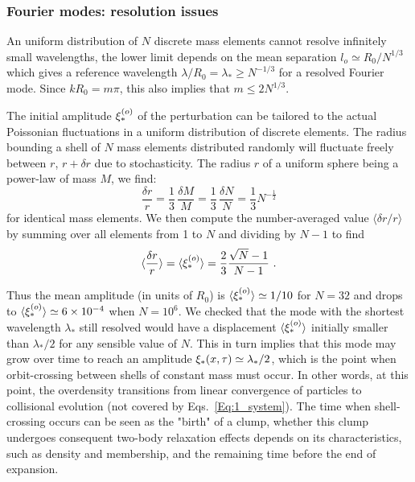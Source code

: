 \subsubsection{Fourier modes: resolution issues} 
\label{Ssub:1_FourierModes}
An uniform distribution of $N$ discrete mass elements cannot resolve infinitely small wavelengths, the lower limit depends on the mean separation $l_o\simeq R_0 / N^{1/3}$ which gives a reference wavelength $\lambda / R_0 = \lambda_\ast \ge N^{-1/3}$ for a resolved  Fourier mode. 
Since $kR_0 = m\pi$, this also implies that $ m \le 2 N^{1/3}$.  

The initial amplitude $\xi_\ast^{(o)}$  of the perturbation can be tailored to the actual Poissonian fluctuations in a uniform distribution of discrete elements. The radius bounding a shell of $N$ mass elements distributed randomly will fluctuate freely between $r$, $r + \delta r$ due to stochasticity. The radius $r$ of a uniform sphere being a power-law of mass $M$, we 
find:
\begin{equation}
\frac{\delta r}{r} = \frac{1}{3}\,\frac{\delta M}{M} =  \frac{1}{3}\,\frac{\delta N}{N} = \frac{1}{3} N^{-\frac{1}{2}}
\end{equation}
 for identical mass elements. We then compute the number-averaged value $\langle \delta r/r\rangle$ by summing over  all elements from 1 to $N$ and dividing by $N-1$ to find 
\begin{equation}
\langle \frac{\delta r}{r} \rangle = \langle \xistaro\rangle = \frac{2}{3} \frac{\sqrt{N} - 1 }{N - 1} \ .
\end{equation}  

Thus the mean amplitude (in units of $R_0$) is $\langle\xi_\ast^{(o)}\rangle\simeq 1/10$ for $N=32$ and drops to $\langle\xi_\ast^{(o)}\rangle\simeq 6\times 10^{-4}$ when $N = 10^6$. We checked that the mode with the shortest wavelength $\lambda_\ast$ still resolved would have a displacement $\langle\xi_\ast^{(o)}\rangle$ initially 
smaller than $\lambda_\ast/2$ for any sensible value of $N$. This in turn implies that this mode may grow over time to reach an amplitude $\xi_\ast(x,\tau) \simeq \lambda_\ast/2$, which is the point when orbit-crossing between shells of constant mass must occur. In other words, at this point, the overdensity transitions from linear convergence of particles to  collisional evolution (not covered by Eqs.~\ref{Eq:1_system}). The time when shell-crossing occurs can be seen as the "birth" of a clump, whether this clump undergoes consequent two-body relaxation effects depends on its characteristics, such as density and membership, and the remaining time before the end of expansion. 

